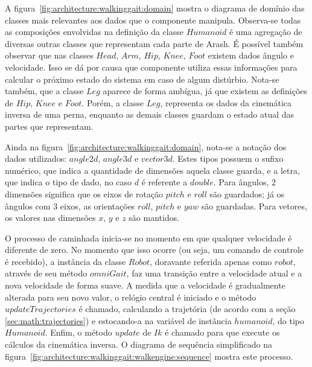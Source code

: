 A figura~\ref{fig:architecture:walkinggait:domain} mostra o diagrama de domínio das classes mais relevantes aos dados que o componente manipula. Observa-se todas as composições envolvidas na definição da classe $Humanoid$ é uma agregação de diversas outras classes que representam cada parte de Arash. É possível também observar que nas classes $Head$, $Arm$, $Hip$, $Knee$, $Foot$ existem dados ângulo e velocidade. Isso se dá por causa que componente utiliza essas informações para calcular o próximo estado do sistema em caso de algum distúrbio. Nota-se também, que a classe $Leg$ aparece de forma ambígua, já que existem as definições de $Hip$, $Knee$ e $Foot$. Porém, a classe $Leg$, representa os dados da cinemática inversa de uma perna, enquanto as demais classes guardam o estado atual das partes que representam.

Ainda na figura~\ref{fig:architecture:walkinggait:domain}, nota-se a notação dos dados utilizados: $angle2d$, $angle3d$ e $vector3d$. Estes tipos possuem o sufixo numérico, que indica a quantidade de dimensões aquela classe guarda, e a letra, que indica o tipo de dado, no caso $d$ é referente a $double$. Para ângulos, $2$ dimensões significa que os eixos de rotação $pitch$ e $roll$ são guardados; já os ângulos com $3$ eixos, as orientações $roll$, $pitch$ e $yaw$ são guardadas. Para vetores, os valores nas dimensões $x$, $y$ e $z$ são mantidos.

O processo de caminhada inicia-se no momento em que qualquer velocidade é diferente de zero. No momento que isso ocorre (ou seja, um comando de controle é recebido), a instância da classe $Robot$, doravante referida apenas como $robot$, através de seu método $omniGait$, faz uma transição entre a velocidade atual e a nova velocidade de forma suave. A medida que a velocidade é gradualmente alterada para seu novo valor, o relógio central é iniciado e o método $updateTrajectories$ é chamado, calculando a trajetória (de acordo com a seção \ref{sec:math:trajectories}) e estocando-a na variável de instância $humanoid$, do tipo $Humanoid$. Enfim, o método $update$ de $Ik$ é chamado para que execute os cálculos da cinemática inversa. O diagrama de sequência simplificado na figura~\ref{fig:architecture:walkinggait:walkengine:sequence} mostra este processo.

